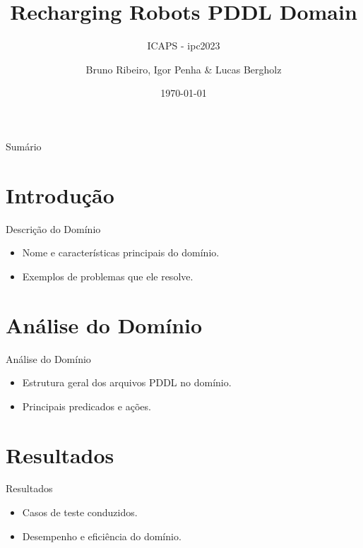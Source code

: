 \documentclass[aspectratio=43]{beamer}
\title{Recharging Robots PDDL Domain}
\subtitle{ICAPS - ipc2023}
\author{Bruno Ribeiro, Igor Penha \& Lucas Bergholz}
\institute{Universidade de Brasília}
\date{\today}
\begin{document}
\begin{frame}
  \titlepage
\end{frame}

\begin{frame}{Sumário}
  \tableofcontents
\end{frame}

\section{Introdução}
\begin{frame}{Descrição do Domínio}
  \begin{itemize}
    \item Nome e características principais do domínio.
    \item Exemplos de problemas que ele resolve.
  \end{itemize}
\end{frame}

\section{Análise do Domínio}
\begin{frame}[allowframebreaks]{Análise do Domínio}
  \begin{itemize}
    \item Estrutura geral dos arquivos PDDL no domínio.
    \item Principais predicados e ações.
  \end{itemize}
  \vspace{1em}
  
\end{frame}

\section{Resultados}
\begin{frame}{Resultados}
  \begin{itemize}
    \item Casos de teste conduzidos.
    \item Desempenho e eficiência do domínio.
  \end{itemize}
\end{frame}
\end{document}

